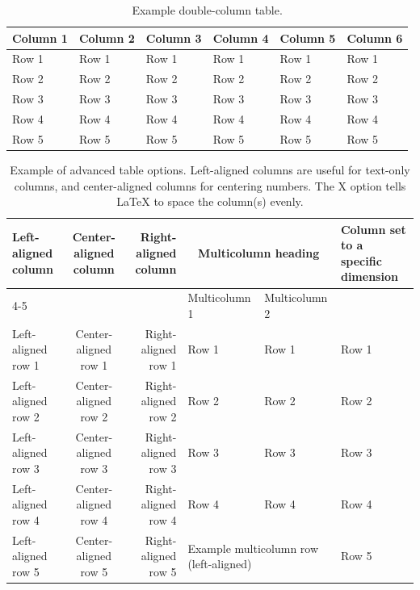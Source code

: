 \documentclass[twocolumn,twoside]{base/jrekpros}
\begin{document}
\begin{table}[t]
  	\centering\footnotesize\sffamily
  	\caption{Example double-column table.}
  	\begin{tableminipage}{\linewidth}
    	\begin{tabularx} {\linewidth}{XXXXXX}
			\toprule
            Column 1 & Column 2 & Column 3 & Column 4 & Column 5 & Column 6 \\
	    	\midrule
            Row 1 & Row 1 & Row 1 & Row 1 & Row 1 & Row 1 \\
            Row 2 & Row 2 & Row 2 & Row 2 & Row 2 & Row 2 \\
            Row 3 & Row 3 & Row 3 & Row 3 & Row 3 & Row 3 \\
            Row 4 & Row 4 & Row 4 & Row 4 & Row 4 & Row 4 \\
            Row 5 & Row 5 & Row 5 & Row 5 & Row 5 & Row 5 \\
            \bottomrule
    	\end{tabularx}
        \label{tab:2}
  	\end{tableminipage}
\end{table}

\begin{table}[b]
  	\centering\footnotesize\sffamily
  	\caption{Example of advanced table options. Left-aligned columns are useful for text-only columns, and center-aligned columns for centering numbers. The X option tells \LaTeX{} to space the column(s) evenly.}
  	\begin{tableminipage}{\linewidth}
    	\begin{tabularx} {\linewidth}{lcrXXp{3cm}}
			\toprule
            Left-aligned column & Center-aligned column & Right-aligned column & \multicolumn{2}{c}{Multicolumn heading} & Column set to a specific \newline dimension \\
            \cmidrule{4-5}
            & & & Multicolumn 1 & Multicolumn 2 & \\
	    	\midrule
            Left-aligned row 1 & Center-aligned row 1 & Right-aligned row 1 & Row 1 & Row 1 & Row 1 \\
            Left-aligned row 2 & Center-aligned row 2 & Right-aligned row 2 & Row 2 & Row 2 & Row 2 \\
            Left-aligned row 3 & Center-aligned row 3 & Right-aligned row 3 & Row 3 & Row 3 & Row 3 \\
            Left-aligned row 4 & Center-aligned row 4 & Right-aligned row 4 & Row 4 & Row 4 & Row 4 \\
            Left-aligned row 5 & Center-aligned row 5 & Right-aligned row 5 & \multicolumn{2}{l}{Example multicolumn row (left-aligned)} & Row 5 \\
            \bottomrule
    	\end{tabularx}
        \label{tab:3}
  	\end{tableminipage}
\end{table}
\end{document}
